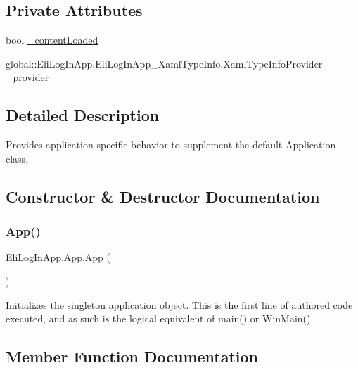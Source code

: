 \subsection*{Private Attributes}
\begin{DoxyCompactItemize}
\item 
bool \hyperlink{class_eli_log_in_app_1_1_app_a71e2bbbc7515a25fd496fcfe8147be7d}{\+\_\+content\+Loaded}
\item 
global\+::\+Eli\+Log\+In\+App.\+Eli\+Log\+In\+App\+\_\+\+Xaml\+Type\+Info.\+Xaml\+Type\+Info\+Provider \hyperlink{class_eli_log_in_app_1_1_app_a69a630d438b0944c8b601852c659451d}{\+\_\+provider}
\end{DoxyCompactItemize}


\subsection{Detailed Description}
Provides application-\/specific behavior to supplement the default Application class. 



\subsection{Constructor \& Destructor Documentation}
\mbox{\label{class_eli_log_in_app_1_1_app_a1881a5791d14df487c47cc44b1ba5919}} 
\subsubsection{\texorpdfstring{App()}{App()}}
{\footnotesize\ttfamily Eli\+Log\+In\+App.\+App.\+App (\begin{DoxyParamCaption}{ }\end{DoxyParamCaption})\hspace{0.3cm}{\ttfamily [inline]}}



Initializes the singleton application object. This is the first line of authored code executed, and as such is the logical equivalent of main() or Win\+Main(). 



\subsection{Member Function Documentation}
\mbox{\label{class_eli_log_in_app_1_1_app_a2942a44ac2e8363cf60e407fefefad14}} 
